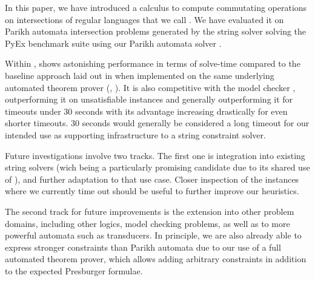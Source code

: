 In this paper, we have introduced a calculus to compute commutating operations on
intersections of regular languages that we call \Calculus{}. We have evaluated
it on \NrBenchmarks{} Parikh automata intersection problems generated by the
\OstrichPlus{} string solver \cite{ostrich-plus} solving the PyEx benchmark
suite \cite{pyex} using our Parikh automata solver \Catra{}.

Within \Catra{}, \Calculus{} shows astonishing performance in terms of
solve-time compared to the baseline approach laid out in
\cite{generate-parikh-image} when implemented on the same underlying automated
theorem prover (\Princess{}, \cite{princess}). It is also competitive with the
\Nuxmv{} model checker \cite{nuxmv}, outperforming it on unsatisfiable instances
and generally outperforming it for timeouts under 30 seconds with its advantage
increasing drastically for even shorter timeouts. 30 seconds would generally be
considered a long timeout for our intended use as supporting infrastructure to a
string constraint solver.

Future investigations involve two tracks. The first one is integration into
existing string solvers (wich \Ostrich{} being a particularly promising
candidate due to its shared use of \Princess{}), and further adaptation to that
use case. Closer inspection of the instances where we currently time out should
be useful to further improve our heuristics.

The second track for future improvements is the extension into other problem
domains, including other logics, model checking problems, as well as to more
powerful automata such as transducers. In principle, we are also already able to
express stronger constraints than Parikh automata due to our use of a full
automated theorem prover, which allows adding arbitrary constraints in addition
to the expected Presburger formulae.